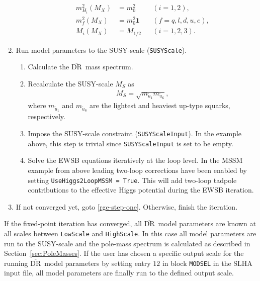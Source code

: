 \documentclass[final,3p,11pt,pdflatex]{elsarticle}
\newcommand{\code}[1]{\lstinline|#1|}  %
\newcommand{\textoverline}[1]{$\overline{\mbox{#1}}$}
\newcommand{\DRbar}{\textoverline{DR}\xspace}
\newcommand{\secref}[1]{Section~\ref{#1}}
\begin{document}
\begin{enumerate}
\begin{enumerate}
\begin{align}
      m_{H_i}^2(M_X) &= m_0^2 & &(i=1,2),\\
      m_{f}^2(M_X) &= m_0^2\mathbf{1} & &(f=q,l,d,u,e),\\
      M_{i}(M_X) &= M_{1/2} & &(i=1,2,3).
    \end{align}\label{eq:fs-cmssm-high-scale-bc}%
  \end{enumerate}
\item Run model parameters to the SUSY-scale (\code{SUSYScale}).
  \begin{enumerate}
  \item Calculate the \DRbar\ mass spectrum.
  \item Recalculate the SUSY-scale $M_S$ as
    \begin{align}
      M_S = \sqrt{m_{\tilde{u}_1}m_{\tilde{u}_6}},
    \end{align}
    where $m_{\tilde{u}_1}$ and $m_{\tilde{u}_6}$ are the lightest and
    heaviest up-type squarks, respectively.
  \item Impose the SUSY-scale constraint (\code{SUSYScaleInput}).  In
    the example above, this step is trivial since
    \code{SUSYScaleInput} is set to be empty.
  \item Solve the EWSB equations iteratively at the loop level.  In
    the MSSM example from above leading two-loop corrections have been
    enabled by setting \code{UseHiggs2LoopMSSM = True}.  This will
    add two-loop tadpole contributions to the effective Higgs
    potential during the EWSB iteration.
  \end{enumerate}
\item If not converged yet, goto \ref{rge-step-one}.  Otherwise,
  finish the iteration.
\end{enumerate}
%
If the fixed-point iteration has converged, all \DRbar\ model
parameters are known at all scales between \code{LowScale} and
\code{HighScale}.  In this case all model parameters are run to the
SUSY-scale and the pole-mass spectrum is calculated as described in
\secref{sec:PoleMasses}.  If the user has chosen a specific output
scale for the running \DRbar\ model parameters by setting entry $12$
in block \code{MODSEL} in the SLHA input file, all model parameters
are finally run to the defined output scale.
%
\end{document}

